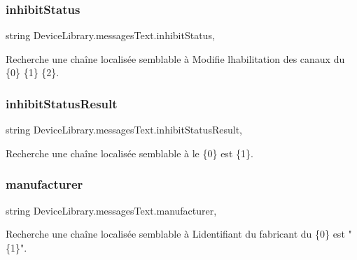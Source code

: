 \subsubsection{\texorpdfstring{inhibit\+Status}{inhibitStatus}}
{\footnotesize\ttfamily string Device\+Library.\+messages\+Text.\+inhibit\+Status\hspace{0.3cm}{\ttfamily [static]}, {\ttfamily [get]}}



Recherche une chaîne localisée semblable à Modifie l\textquotesingle{}habilitation des canaux du \{0\} \{1\} \{2\}. 

\mbox{\label{class_device_library_1_1messages_text_ac37e35f9f795175e6dca7d0b49b33637}} 
\subsubsection{\texorpdfstring{inhibit\+Status\+Result}{inhibitStatusResult}}
{\footnotesize\ttfamily string Device\+Library.\+messages\+Text.\+inhibit\+Status\+Result\hspace{0.3cm}{\ttfamily [static]}, {\ttfamily [get]}}



Recherche une chaîne localisée semblable à le \{0\} est \{1\}. 

\mbox{\label{class_device_library_1_1messages_text_a2f62050bea514c3f25710deb511535dc}} 
\subsubsection{\texorpdfstring{manufacturer}{manufacturer}}
{\footnotesize\ttfamily string Device\+Library.\+messages\+Text.\+manufacturer\hspace{0.3cm}{\ttfamily [static]}, {\ttfamily [get]}}



Recherche une chaîne localisée semblable à L\textquotesingle{}identifiant du fabricant du \{0\} est "\{1\}". 

